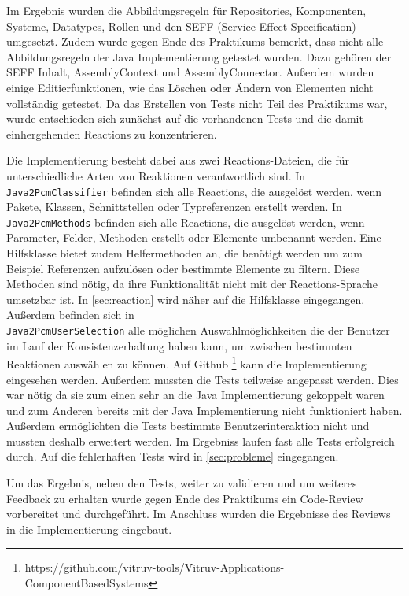 \documentclass[ngerman,runningheads]{llncs}
\begin{document}
Im Ergebnis wurden die Abbildungsregeln für Repositories, Komponenten, Systeme, Datatypes, Rollen und den SEFF (Service Effect Specification) umgesetzt. Zudem wurde gegen Ende des Praktikums bemerkt, dass nicht alle Abbildungsregeln der Java Implementierung getestet wurden. Dazu gehören der SEFF Inhalt, AssemblyContext und AssemblyConnector. Außerdem wurden einige Editierfunktionen, wie das Löschen oder Ändern von Elementen nicht vollständig getestet. Da das Erstellen von Tests nicht Teil des Praktikums war, wurde entschieden sich zunächst auf die vorhandenen Tests und die damit einhergehenden Reactions zu konzentrieren. \par 
Die Implementierung besteht dabei aus zwei Reactions-Dateien, die für unterschiedliche Arten von Reaktionen verantwortlich sind. In \texttt{Java2PcmClassifier} befinden sich alle Reactions, die ausgelöst werden, wenn Pakete, Klassen, Schnittstellen oder Typreferenzen erstellt werden. In \texttt{Java2PcmMethods} befinden sich alle Reactions, die ausgelöst werden, wenn Parameter, Felder, Methoden erstellt oder Elemente umbenannt werden. Eine Hilfsklasse bietet zudem Helfermethoden an, die benötigt werden um zum Beispiel Referenzen aufzulösen oder bestimmte Elemente zu filtern. Diese Methoden sind nötig, da ihre Funktionalität nicht mit der Reactions-Sprache umsetzbar ist. In \autoref{sec:reaction} wird näher auf die Hilfsklasse eingegangen. Außerdem befinden sich in \\ \texttt{Java2PcmUserSelection} alle möglichen Auswahlmöglichkeiten die der Benutzer im Lauf der Konsistenzerhaltung haben kann, um zwischen bestimmten Reaktionen auswählen zu können. Auf Github \footnote{https://github.com/vitruv-tools/Vitruv-Applications-ComponentBasedSystems} kann die Implementierung eingesehen werden. Außerdem mussten die Tests teilweise angepasst werden. Dies war nötig da sie zum einen sehr an die Java Implementierung gekoppelt waren und zum Anderen bereits mit der Java Implementierung nicht funktioniert haben. Außerdem ermöglichten die Tests bestimmte Benutzerinteraktion nicht und mussten deshalb erweitert werden. Im Ergebniss laufen fast alle Tests erfolgreich durch. Auf die fehlerhaften Tests wird in \autoref{sec:probleme} eingegangen. \par
Um das Ergebnis, neben den Tests, weiter zu validieren und um weiteres Feedback zu erhalten wurde gegen Ende des Praktikums ein Code-Review vorbereitet und durchgeführt. Im Anschluss wurden die Ergebnisse des Reviews in die Implementierung eingebaut. \par
\end{document}
